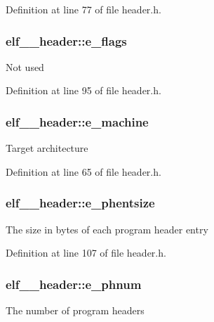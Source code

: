 Definition at line 77 of file header.h.

\hypertarget{structelf__32__header_a8f71f679060089292a31b5e948815215}{
\subsubsection[{e\_\-flags}]{ {\bf elf\_\_\-header::e\_\-flags}}}
\label{structelf__32__header_a8f71f679060089292a31b5e948815215}
Not used 

Definition at line 95 of file header.h.

\hypertarget{structelf__32__header_a4fc95a48457d0bbf3937dfabcb4152ba}{
\subsubsection[{e\_\-machine}]{ {\bf elf\_\_\-header::e\_\-machine}}}
\label{structelf__32__header_a4fc95a48457d0bbf3937dfabcb4152ba}
Target architecture 

Definition at line 65 of file header.h.

\hypertarget{structelf__32__header_af679dc989e4b55d4b74806a1d2590187}{
\subsubsection[{e\_\-phentsize}]{ {\bf elf\_\_\-header::e\_\-phentsize}}}
\label{structelf__32__header_af679dc989e4b55d4b74806a1d2590187}
The size in bytes of each program header entry 

Definition at line 107 of file header.h.

\hypertarget{structelf__32__header_af0a0631bd17fedab7907fa3b057a1746}{
\subsubsection[{e\_\-phnum}]{ {\bf elf\_\_\-header::e\_\-phnum}}}
\label{structelf__32__header_af0a0631bd17fedab7907fa3b057a1746}
The number of program headers 

